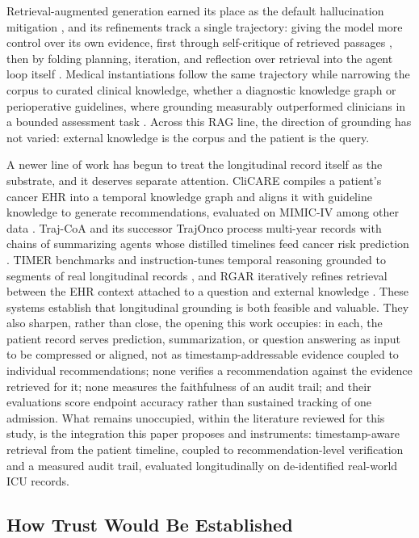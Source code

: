 Retrieval-augmented generation earned its place as the default hallucination mitigation
\cite{lewis2020rag,gao2023rag}, and its refinements track a single trajectory: giving the model
more control over its own evidence, first through self-critique of retrieved passages
\cite{asai2024selfrag}, then by folding planning, iteration, and reflection over retrieval into
the agent loop itself \cite{singh2025agenticrag}. Medical instantiations follow the same
trajectory while narrowing the corpus to curated clinical knowledge, whether a diagnostic
knowledge graph \cite{zhao2025medrag} or perioperative guidelines, where grounding measurably
outperformed clinicians in a bounded assessment task \cite{ke2025ragfitness}. Across this RAG
line, the direction of grounding has not varied: external knowledge is the corpus and the
patient is the query.

A newer line of work has begun to treat the longitudinal record itself as the substrate, and
it deserves separate attention. CliCARE compiles a patient's cancer EHR into a temporal
knowledge graph and aligns it with guideline knowledge to generate recommendations,
evaluated on MIMIC-IV among other data \cite{li2026clicare}. Traj-CoA and its successor TrajOnco
process multi-year records with chains of summarizing agents whose distilled timelines feed
cancer risk prediction \cite{zeng2025trajcoa,zeng2026trajonco}. TIMER benchmarks and
instruction-tunes temporal reasoning grounded to segments of real longitudinal records
\cite{cui2025timer}, and RGAR iteratively refines retrieval between the EHR context attached to a
question and external knowledge \cite{liang2025rgar}. These systems establish that longitudinal
grounding is both feasible and valuable. They also sharpen, rather than close, the opening
this work occupies: in each, the patient record serves prediction, summarization, or
question answering as input to be compressed or aligned, not as timestamp-addressable
evidence coupled to individual recommendations; none verifies a recommendation against the
evidence retrieved for it; none measures the faithfulness of an audit trail; and their
evaluations score endpoint accuracy rather than sustained tracking of one admission. What
remains unoccupied, within the literature reviewed for this study, is the integration this
paper proposes and instruments: timestamp-aware retrieval from the patient timeline, coupled
to recommendation-level verification and a measured audit trail, evaluated longitudinally on
de-identified real-world ICU records.

\subsection{How Trust Would Be Established}

